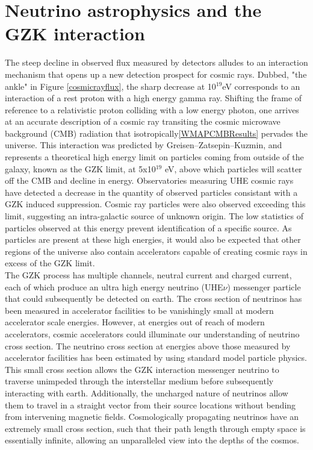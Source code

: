 \section{Neutrino astrophysics and the GZK interaction}
		The steep decline in observed flux measured by detectors alludes to an interaction mechanism that opens up a new detection prospect for cosmic rays.  Dubbed, "the ankle" in Figure \ref{cosmicrayflux}, the sharp decrease at 10$^{19}$eV corresponds to an interaction of a rest proton with a high energy gamma ray.  Shifting the frame of reference to a relativistic proton colliding with a low energy photon, one arrives at an accurate description of a cosmic ray transiting the cosmic microwave background (CMB) radiation that isotropically\ref{WMAPCMBResults} pervades the universe.  This interaction was predicted by Greisen–Zatsepin–Kuzmin, and represents a theoretical high energy limit on particles coming from outside of the galaxy, known as the GZK limit, at 5x10$^{19}$ eV, above which particles will scatter off the CMB and decline in energy.\cite{GZK}  Observatories measuring UHE cosmic rays have detected a decrease in the quantity of observed particles consistant with a GZK induced suppression.\cite{GZKMeasurement} Cosmic ray particles were also observed exceeding this limit, suggesting an intra-galactic source of unknown origin.  The low statistics of particles observed at this energy prevent identification of a specific source.  As particles are present at these high energies, it would also be expected that other regions of the universe also contain accelerators capable of creating cosmic rays in excess of the GZK limit.  \\
		
		The GZK process has multiple channels, neutral current and charged current, each of which produce an ultra high energy neutrino (UHE$\nu$) messenger particle that could subsequently be detected on earth.\cite{GZK}  The cross section of neutrinos has been measured in accelerator facilities to be vanishingly small at modern accelerator scale energies.\cite{neutrinoCrossSectionMeasurements}  However, at energies out of reach of modern accelerators, cosmic accelerators could illuminate our understanding of neutrino cross section.  The neutrino cross section at energies above those measured by accelerator facilities has been estimated by using standard model particle physics.\cite{neutrinoCrossSectionExtrapolation} This small cross section allows the GZK interaction messenger neutrino to traverse unimpeded through the interstellar medium before subsequently interacting with earth.  Additionally, the uncharged nature of neutrinos allow them to travel in a straight vector from their source locations without bending from intervening magnetic fields.  Cosmologically propagating neutrinos have an extremely small cross section, such that their path length through empty space is essentially infinite, allowing an unparalleled view into the depths of the cosmos.

